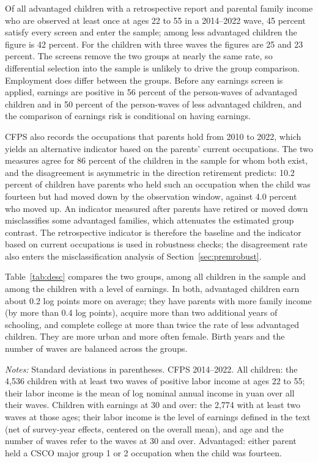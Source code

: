 \documentclass[11pt]{article}
\begin{document}
Of all advantaged children with a retrospective report and parental family income who are observed at least once
at ages 22 to 55 in a 2014--2022 wave, 45 percent satisfy every
screen and enter the sample; among less advantaged children the
figure is 42 percent. For the children with three waves the figures are
25 and 23 percent. The screens remove the two groups at nearly the
same rate, so differential selection into the sample is unlikely to drive the group
comparison. Employment does differ between the groups. Before any
earnings screen is applied, earnings are positive in 56 percent of the
person-waves of advantaged children and in 50 percent of the
person-waves of less advantaged children, and the comparison of earnings risk
is conditional on having earnings.

CFPS also records the occupations that parents hold from 2010 to 2022, which yields an alternative indicator based on the
parents' current occupations. The
two measures agree for 86 percent of the children in the sample for whom both exist, and
the disagreement is asymmetric in the direction retirement predicts:
10.2 percent of children have parents who held such an occupation when
the child was fourteen but had moved down by the observation window,
against 4.0 percent who moved up. An indicator measured after parents
have retired or moved down misclassifies some advantaged families,
which attenuates the estimated group contrast. The retrospective
indicator is therefore the baseline and the indicator based on current
occupations is used
in robustness checks; the disagreement rate also enters the
misclassification analysis of Section~\ref{sec:premrobust}.

Table~\ref{tab:desc} compares the two groups, among all children in the sample and among the children with a level of earnings. In both, advantaged children earn
about 0.2 log points more on average; they have parents with more
family income (by more than 0.4 log points), acquire more than two additional years of schooling, and complete
college at more than twice the rate of less advantaged children.
They are more urban and more often female. Birth years and the number of waves
are balanced across the groups.

\begin{table}[t]
\centering
\small
\caption{The sample: means by family background.}
\label{tab:desc}

\par\smallskip
\begin{minipage}{0.92\textwidth}
\footnotesize\emph{Notes:} Standard deviations in parentheses. CFPS
2014--2022. All children: the 4,536 children with at least two waves of
positive labor income at ages 22 to 55; their labor income is the mean
of log nominal annual income in yuan over all their waves. Children
with earnings at 30 and over: the 2,774 with at least two
waves at those ages; their labor income is the level of earnings
defined in the text (net of survey-year effects, centered on the overall mean), and age and the number of waves refer to the waves
at 30 and over. Advantaged: either parent held a CSCO major group 1 or
2 occupation when the child was fourteen.
\end{minipage}
\end{table}
\end{document}
